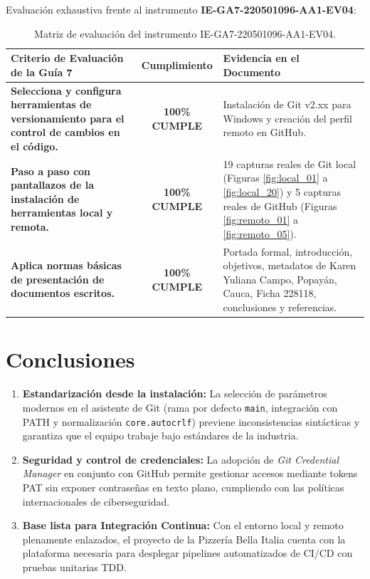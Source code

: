 \documentclass[11pt,a4paper]{article}
\begin{document}
Evaluación exhaustiva frente al instrumento \textbf{IE-GA7-220501096-AA1-EV04}:

\begin{table}[H]
\centering
\small
\begin{tabular}{p{7.5cm}cp{5.5cm}}
\toprule
\textbf{Criterio de Evaluación de la Guía 7} & \textbf{Cumplimiento} & \textbf{Evidencia en el Documento} \\
\midrule
\textbf{Selecciona y configura herramientas de versionamiento para el control de cambios en el código.} & \textbf{\color{senaGreen}100\% CUMPLE} & Instalación de Git v2.xx para Windows y creación del perfil remoto en GitHub. \\
\addlinespace
\textbf{Paso a paso con pantallazos de la instalación de herramientas local y remota.} & \textbf{\color{senaGreen}100\% CUMPLE} & 19 capturas reales de Git local (Figuras \ref{fig:local_01} a \ref{fig:local_20}) y 5 capturas reales de GitHub (Figuras \ref{fig:remoto_01} a \ref{fig:remoto_05}). \\
\addlinespace
\textbf{Aplica normas básicas de presentación de documentos escritos.} & \textbf{\color{senaGreen}100\% CUMPLE} & Portada formal, introducción, objetivos, metadatos de Karen Yuliana Campo, Popayán, Cauca, Ficha 228118, conclusiones y referencias. \\
\bottomrule
\end{tabular}
\caption{Matriz de evaluación del instrumento IE-GA7-220501096-AA1-EV04.}
\end{table}

\section{Conclusiones}
\begin{enumerate}[label=\arabic*.]
    \item \textbf{Estandarización desde la instalación:} La selección de parámetros modernos en el asistente de Git (rama por defecto \texttt{main}, integración con PATH y normalización \texttt{core.autocrlf}) previene inconsistencias sintácticas y garantiza que el equipo trabaje bajo estándares de la industria.
    \item \textbf{Seguridad y control de credenciales:} La adopción de \textit{Git Credential Manager} en conjunto con GitHub permite gestionar accesos mediante tokens PAT sin exponer contraseñas en texto plano, cumpliendo con las políticas internacionales de ciberseguridad.
    \item \textbf{Base lista para Integración Continua:} Con el entorno local y remoto plenamente enlazados, el proyecto de la Pizzería Bella Italia cuenta con la plataforma necesaria para desplegar pipelines automatizados de CI/CD con pruebas unitarias TDD.
\end{enumerate}
\end{document}
